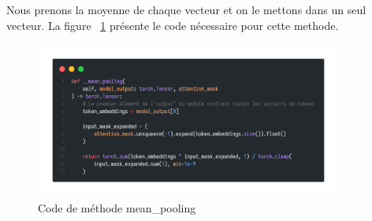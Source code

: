 \noindent
Nous prenons la moyenne de chaque vecteur et on le mettons dans un seul vecteur. La figure ~\ref{fig:meanpoolingmethod} présente le code nécessaire pour cette methode.

\begin{figure}[H]
	\centering
	\includegraphics[width=0.9\textwidth]{logos/mean_pooling_method.png}
	\caption{Code de méthode mean\_pooling}
	\label{fig:meanpoolingmethod}
\end{figure}

